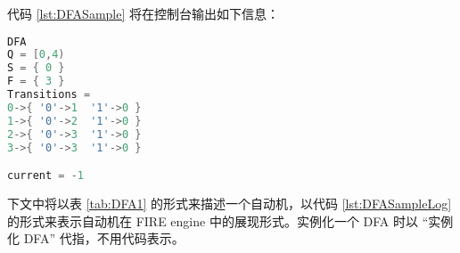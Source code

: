 
代码 \ref{lst:DFASample} 将在控制台输出如下信息：

\begin{lstlisting}[language=C++,label={lst:DFASampleLog},caption={图\ref{fig:DFA1}中自动机在 FIRE engine 中的表现形式}]
DFA
Q = [0,4)
S = { 0 }
F = { 3 }
Transitions =
0->{ '0'->1  '1'->0 }
1->{ '0'->2  '1'->0 }
2->{ '0'->3  '1'->0 }
3->{ '0'->3  '1'->0 }

current = -1
\end{lstlisting}

下文中将以表 \ref{tab:DFA1} 的形式来描述一个自动机，以代码 \ref{lst:DFASampleLog} 的形式来表示自动机在 FIRE engine 中的展现形式。实例化一个 DFA 时以 “实例化 DFA” 代指，不用代码表示。 